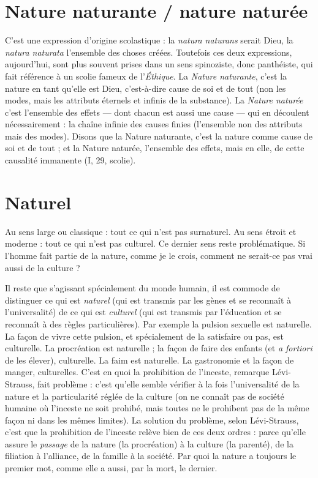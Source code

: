 \section{Nature naturante / nature naturée}
C’est une expression d’origine scolastique : la {\it natura
naturans} serait Dieu, la {\it natura naturata} l'ensemble des choses créées. Toutefois
ces deux expressions, aujourd’hui, sont plus souvent prises dans un sens spinoziste,
donc panthéiste, qui fait référence à un scolie fameux de l’{\it Éthique}. La
{\it Nature naturante}, c’est la nature en tant qu’elle est Dieu, c’est-à-dire cause de
soi et de tout (non les modes, mais les attributs éternels et infinis de la substance).
La {\it Nature naturée} c’est l’ensemble des effets — dont chacun est aussi une
cause — qui en découlent nécessairement : la chaîne infinie des causes finies
(l'ensemble non des attributs mais des modes). Disons que la Nature naturante,
c’est la nature comme cause de soi et de tout ; et la Nature naturée,
l’ensemble des effets, mais en elle, de cette causalité immanente (I, 29, scolie).

\section{Naturel}
Au sens large ou classique : tout ce qui n’est pas surnaturel. Au
sens étroit et moderne : tout ce qui n’est pas culturel. Ce dernier
sens reste problématique. Si l’homme fait partie de la nature, comme je le crois,
comment ne serait-ce pas vrai aussi de la culture ?

Il reste que s’agissant spécialement du monde humain, il est commode de
distinguer ce qui est {\it naturel} (qui est transmis par les gènes et se reconnaît à
l’universalité) de ce qui est {\it culturel} (qui est transmis par l'éducation et se reconnaît
à des règles particulières). Par exemple la pulsion sexuelle est naturelle. La
façon de vivre cette pulsion, et spécialement de la satisfaire ou pas, est culturelle.
La procréation est naturelle ; la façon de faire des enfants (et {\it a fortiori} de
les élever), culturelle. La faim est naturelle. La gastronomie et la façon de
manger, culturelles. C’est en quoi la prohibition de l'inceste, remarque Lévi-Strauss,
fait problème : c’est qu’elle semble vérifier à la fois l’universalité de la
nature et la particularité réglée de la culture (on ne connaît pas de société
humaine où l'inceste ne soit prohibé, mais toutes ne le prohibent pas de la
même façon ni dans les mêmes limites). La solution du problème, selon Lévi-Strauss,
c’est que la prohibition de l'inceste relève bien de ces deux ordres :
parce qu’elle assure le {\it passage} de la nature (la procréation) à la culture (la
parenté), de la filiation à l'alliance, de la famille à la société. Par quoi la nature
a toujours le premier mot, comme elle a aussi, par la mort, le dernier.

